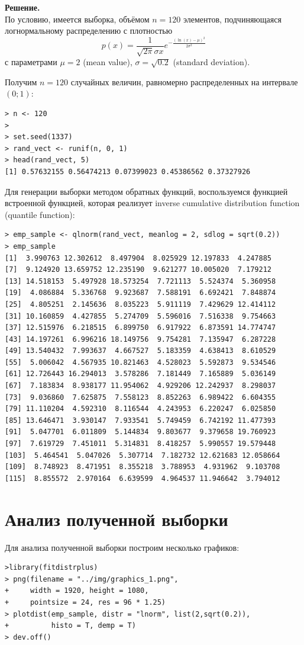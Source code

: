 \documentclass[14pt,a4paper]{scrartcl}
\begin{document}
\pagebreak
\textbf{Решение.}\\
По условию, имеется выборка, объёмом $n = 120$ элементов, подчиняющаяся логнормальному распределению с плотностью
\begin{equation*}
	p(x) = \frac{1}{\sqrt{2\pi} \sigma x} e^{-\frac{(\ln(x) - \mu)^2}{2\sigma^2}}
\end{equation*}
с параметрами $\mu = 2$ (mean value), $\sigma = \sqrt{0.2}$ (standard deviation).

Получим $n = 120$ случайных величин, равномерно распределенных на интервале $(0;1)$:
\begin{verbatim}
> n <- 120
> 
> set.seed(1337)
> rand_vect <- runif(n, 0, 1)
> head(rand_vect, 5)
[1] 0.57632155 0.56474213 0.07399023 0.45386562 0.37327926
\end{verbatim}

Для генерации выборки методом обратных функций, воспользуемся функцией встроенной функцией, которая реализует  inverse cumulative distribution function (quantile function):
\begin{verbatim}
> emp_sample <- qlnorm(rand_vect, meanlog = 2, sdlog = sqrt(0.2))
> emp_sample
[1]  3.990763 12.302612  8.497904  8.025929 12.197833  4.247885
[7]  9.124920 13.659752 12.235190  9.621277 10.005020  7.179212
[13] 14.518153  5.497928 18.573254  7.721113  5.524374  5.360958
[19]  4.086884  5.336768  9.923687  7.588191  6.692421  7.848874
[25]  4.805251  2.145636  8.035223  5.911119  7.429629 12.414112
[31] 10.160859  4.427855  5.274709  5.596016  7.516338  9.754663
[37] 12.515976  6.218515  6.899750  6.917922  6.873591 14.774747
[43] 14.197261  6.996216 18.149756  9.754281  7.135947  6.287228
[49] 13.540432  7.993637  4.667527  5.183359  4.638413  8.610529
[55]  5.006042  4.567935 10.821463  4.528023  5.592873  9.534546
[61] 12.726443 16.294013  3.578286  7.181449  7.165889  5.036149
[67]  7.183834  8.938177 11.954062  4.929206 12.242937  8.298037
[73]  9.036860  7.625875  7.558123  8.852263  6.989422  6.604355
[79] 11.110204  4.592310  8.116544  4.243953  6.220247  6.025850
[85] 13.646471  3.930147  7.933541  5.749459  6.742192 11.477393
[91]  5.047701  6.011809  5.144834  9.803677  9.379658 19.760923
[97]  7.619729  7.451011  5.314831  8.418257  5.990557 19.579448
[103]  5.464541  5.047026  5.307714  7.182732 12.621683 12.058664
[109]  8.748923  8.471951  8.355218  3.788953  4.931962  9.103708
[115]  8.855572  2.970164  6.639599  4.964537 11.946642  3.794012
\end{verbatim}

\section{Анализ полученной выборки}
Для анализа полученной выборки построим несколько графиков:
\begin{verbatim}
>library(fitdistrplus)
> png(filename = "../img/graphics_1.png", 
+     width = 1920, height = 1080,
+     pointsize = 24, res = 96 * 1.25)
> plotdist(emp_sample, distr = "lnorm", list(2,sqrt(0.2)),
+          histo = T, demp = T)
> dev.off()

\end{verbatim}
\end{document}

